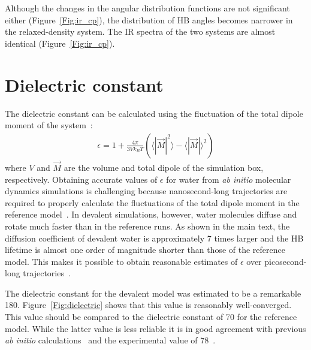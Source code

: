 \documentclass[10pt,amsmath,twocolumn,aps,prl,superscriptaddress,floatfix]{revtex4-1}
\newcommand{\bea}{\begin{eqnarray}}
\newcommand{\eea}{\end{eqnarray}}
\begin{document}
Although the changes in the angular distribution functions are not significant either (Figure~\ref{Fig:ir_cp}), the distribution of HB angles becomes narrower in the relaxed-density system. The IR spectra of the two systems are almost identical (Figure~\ref{Fig:ir_cp}).

%

\section{Dielectric constant} 

The dielectric constant can be calculated using the fluctuation of the total dipole moment of the system~\cite{neumann1983dipole,adams1981theory}:
%
\bea
\epsilon = 1+\frac{4\pi}{3V k_B T}  (  \langle |\vec{M}|^2 \rangle  - \langle |\vec{M}| \rangle ^2) \label{Eq:dielectric}
\eea
%
where $V$ and $\vec{M}$ are the volume and total dipole of the simulation box, respectively. 
Obtaining accurate values of $\epsilon$ for water from \emph{ab initio} molecular dynamics simulations is challenging because nanosecond-long trajectories are required to properly calculate the fluctuations of the total dipole moment in the reference model~\cite{zhang2016computing}. 
In devalent simulations, however, water molecules diffuse and rotate much faster than in the reference runs. As shown in the main text, the diffusion coefficient of devalent water is approximately 7 times larger and the HB lifetime is almost one order of magnitude shorter than those of the reference model. This makes it possible to obtain reasonable estimates of $\epsilon$ over picosecond-long trajectories~\cite{pan2013dielectric}. 

The dielectric constant for the devalent model was estimated to be a remarkable 180. Figure~\ref{Fig:dielectric} shows that this value is reasonably well-converged. This value should be compared to the dielectric constant of 70 for the reference model. While the latter value is less reliable it is in good agreement with previous \emph{ab initio} calculations~\cite{sharma2007dipolar} and the experimental value of 78~\cite{haynes2014crc}.
\end{document}
